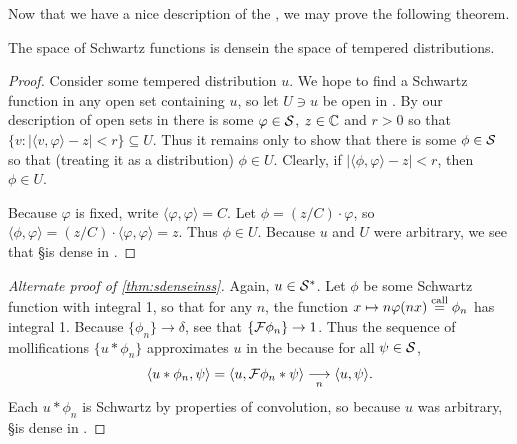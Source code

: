     Now that we have a nice description of the \ws, we may prove the following theorem.
    \begin{thm}
      \label{thm:sdenseinss}
      The space of Schwartz functions is dense\footnotemark in the space of tempered distributions.
    \end{thm}
    \begin{proof}
      Consider some tempered distribution $u$.
      We hope to find a Schwartz function in any open set containing $u$, so let $U\ni u$ be open in \SS.
      By our description of open sets in \SS there is some $\varphi\in\S$, $z\in\C$ and $r>0$ so that $\{v: |\langle v,\varphi\rangle-z|<r\}\subseteq U$.
      Thus it remains only to show that there is some $\phi\in\S$ so that (treating it as a distribution) $\phi\in U$.
      Clearly, if $|\langle\phi,\varphi\rangle-z|<r$, then $\phi\in U$.

      Because $\varphi$ is fixed, write $\langle\varphi,\varphi\rangle=C$.
      Let $\phi = (z/C)\cdot\varphi$, so $\langle\phi,\varphi\rangle = (z/C)\cdot\langle\varphi,\varphi\rangle = z$.
      Thus $\phi\in U$.  
      Because $u$ and $U$ were arbitrary, we see that \S is dense in \SS.
    \end{proof}

    \begin{proof}[Alternate proof of \cref{thm:sdenseinss}]
      Again, $u\in\SS$.
      Let $\phi$ be some Schwartz function with integral 1, so that for any $n$, the function $x\mapsto n\varphi(nx) \call \phi_n$ has integral 1.
      Because $\{\phi_n\}\rightarrow\delta$, see that $\{\F\phi_n\}\rightarrow 1$.
      Thus the sequence of mollifications $\{u*\phi_n\}$ approximates $u$ in the \ws because for all $\psi\in\S$, 
      \begin{align*}
        \langle u*\phi_n, \psi\rangle = \langle u, \F\phi_n*\psi\rangle \underset{n}{\longrightarrow} \langle u,\psi\rangle \text{.}
      \end{align*}
      Each $u*\phi_n$ is Schwartz by properties of convolution, so because $u$ was arbitrary, \S is dense in \SS.
    \end{proof}


